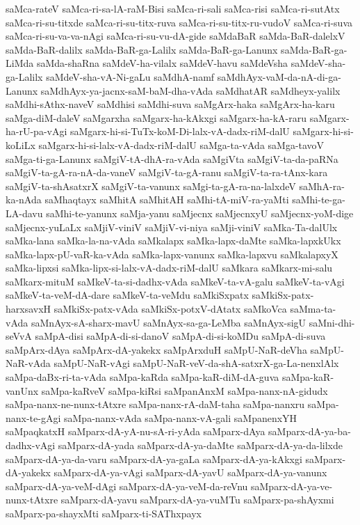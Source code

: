 {saMca-rateV
saMca-ri-sa-lA-raM-Bisi
saMca-ri-sali
saMca-risi
saMca-ri-sutAtx
saMca-ri-su-titxde
saMca-ri-su-titx-ruva
saMca-ri-su-titx-ru-vudoV
saMca-ri-suva
saMca-ri-su-va-va-nAgi
saMca-ri-su-vu-dA-gide
saMdaBaR
saMda-BaR-dalelxV
saMda-BaR-dalilx
saMda-BaR-ga-Lalilx
saMda-BaR-ga-Lanunx
saMda-BaR-ga-LiMda
saMda-shaRna
saMdeV-ha-vilalx
saMdeV-havu
saMdeVsha
saMdeV-sha-ga-Lalilx
saMdeV-sha-vA-Ni-gaLu
saMdhA-namf
saMdhAyx-vaM-da-nA-di-ga-Lanunx
saMdhAyx-ya-jacnx-saM-baM-dha-vAda
saMdhatAR
saMdheyx-yalilx
saMdhi-sAthx-naveV
saMdhisi
saMdhi-suva
saMgArx-haka
saMgArx-ha-karu
saMga-diM-daleV
saMgarxha
saMgarx-ha-kAkxgi
saMgarx-ha-kA-raru
saMgarx-ha-rU-pa-vAgi
saMgarx-hi-si-TuTx-koM-Di-lalx-vA-dadx-riM-dalU
saMgarx-hi-si-koLiLx
saMgarx-hi-si-lalx-vA-dadx-riM-dalU
saMga-ta-vAda
saMga-tavoV
saMga-ti-ga-Lanunx
saMgiV-tA-dhA-ra-vAda
saMgiVta
saMgiV-ta-da-paRNa
saMgiV-ta-gA-ra-nA-da-vaneV
saMgiV-ta-gA-ranu
saMgiV-ta-ra-tAnx-kara
saMgiV-ta-shAsatxrX
saMgiV-ta-vanunx
saMgi-ta-gA-ra-na-lalxdeV
saMhA-ra-ka-nAda
saMhaqtayx
saMhitA
saMhitAH
saMhi-tA-miV-ra-yaMti
saMhi-te-ga-LA-davu
saMhi-te-yanunx
saMja-yanu
saMjecnx
saMjecnxyU
saMjecnx-yoM-dige
saMjecnx-yuLaLx
saMjiV-viniV
saMjiV-vi-niya
saMji-viniV
saMka-Ta-dalUlx
saMka-lana
saMka-la-na-vAda
saMkalapx
saMka-lapx-daMte
saMka-lapxkUkx
saMka-lapx-pU-vaR-ka-vAda
saMka-lapx-vanunx
saMka-lapxvu
saMkalapxyX
saMka-lipxsi
saMka-lipx-si-lalx-vA-dadx-riM-dalU
saMkara
saMkarx-mi-salu
saMkarx-mituM
saMkeV-ta-si-dadhx-vAda
saMkeV-ta-vA-galu
saMkeV-ta-vAgi
saMkeV-ta-veM-dA-dare
saMkeV-ta-veMdu
saMkiSxpatx
saMkiSx-patx-harxsavxH
saMkiSx-patx-vAda
saMkiSx-potxV-dAtatx
saMkoVca
saMma-ta-vAda
saMnAyx-sA-sharx-mavU
saMnAyx-sa-ga-LeMba
saMnAyx-sigU
saMni-dhi-seVvA
saMpA-disi
saMpA-di-si-danoV
saMpA-di-si-koMDu
saMpA-di-suva
saMpArx-dAya
saMpArx-dA-yakekx
saMpArxduH
saMpU-NaR-deVha
saMpU-NaR-vAda
saMpU-NaR-vAgi
saMpU-NaR-veV-da-shA-satxrX-ga-La-nenxlAlx
saMpa-daBx-ri-ta-vAda
saMpa-kaRda
saMpa-kaR-diM-dA-guva
saMpa-kaR-vanUnx
saMpa-kaRveV
saMpa-kiRsi
saMpanAnxM
saMpa-nanx-nA-gidudx
saMpa-nanx-ne-nunx-tAtxre
saMpa-nanx-rA-daM-taha
saMpa-nanxru
saMpa-nanx-te-gAgi
saMpa-nanx-vAda
saMpa-nanx-vA-gali
saMpanenxYH
saMpaqkatxH
saMparx-dA-yA-nu-sA-ri-yAda
saMparx-dAya
saMparx-dA-ya-ba-dadhx-vAgi
saMparx-dA-yada
saMparx-dA-ya-daMte
saMparx-dA-ya-da-lilxde
saMparx-dA-ya-da-varu
saMparx-dA-ya-gaLa
saMparx-dA-ya-kAkxgi
saMparx-dA-yakekx
saMparx-dA-ya-vAgi
saMparx-dA-yavU
saMparx-dA-ya-vanunx
saMparx-dA-ya-veM-dAgi
saMparx-dA-ya-veM-da-reVnu
saMparx-dA-ya-ve-nunx-tAtxre
saMparx-dA-yavu
saMparx-dA-ya-vuMTu
saMparx-pa-shAyxmi
saMparx-pa-shayxMti
saMparx-ti-SAThxpayx
}
